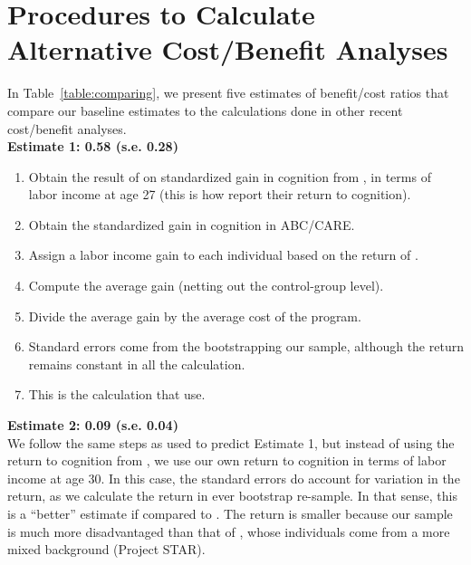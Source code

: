 \section{Procedures to Calculate Alternative Cost/Benefit Analyses}
\label{app:alt-cba}

In Table~\ref{table:comparing}, we present five estimates of benefit/cost ratios that compare our baseline estimates to the calculations done in other recent cost/benefit analyses. \\

\noindent \textbf{Estimate 1: 0.58 (s.e. 0.28)} \\

\begin{enumerate}
\item Obtain the result of on standardized gain in cognition from \citet{Chetty_Friedman_etal_2011_QJoE}, in terms of labor income at age 27 (this is how \citet{Chetty_Friedman_etal_2011_QJoE} report their return to cognition).
\item Obtain the standardized gain in cognition in ABC/CARE.
\item Assign a labor income gain to each individual based on the return of \citet{Chetty_Friedman_etal_2011_QJoE}.
\item Compute the average gain (netting out the control-group level).
\item Divide the average gain by the average cost of the program.
\item Standard errors come from the bootstrapping our sample, although the return remains constant in all the calculation.
\item This is the calculation that \citet{Kline_Walters_2016_QJE} use.
\end{enumerate} 

\noindent \textbf{Estimate 2: 0.09 (s.e. 0.04)} \\

We follow the same steps as used to predict Estimate 1, but instead of using the return to cognition from \citet{Chetty_Friedman_etal_2011_QJoE}, we use our own return to cognition in terms of labor income at age 30. In this case, the standard errors do account for variation in the return, as we calculate the return in ever bootstrap re-sample. In that sense, this is a ``better'' estimate if compared to \citet{Kline_Walters_2016_QJE}. The return is smaller because our sample is much more disadvantaged than that of \citet{Chetty_Friedman_etal_2011_QJoE}, whose individuals come from a more mixed background (Project STAR). \\

